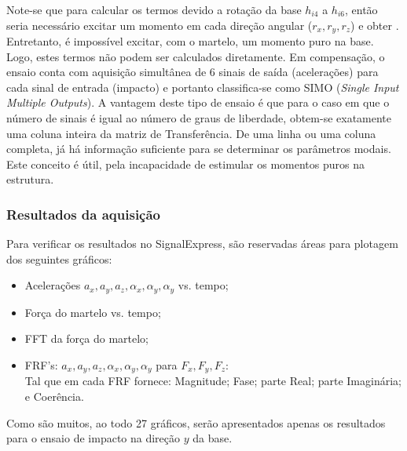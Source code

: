 Note-se que para calcular os termos devido a rotação da base $h_{i4}$ a
$h_{i6}$, então seria necessário excitar um momento em cada direção angular
($r_x,r_y,r_z$) e obter . Entretanto, é impossível excitar, com o martelo, um
momento puro na base. Logo, estes termos não podem ser calculados diretamente.
Em compensação, o ensaio conta com aquisição simultânea de 6 sinais de saída
(acelerações) para cada sinal de entrada (impacto) e portanto classifica-se como
SIMO (\textit{Single Input Multiple Outputs}). A vantagem deste tipo de ensaio é
que para o caso em que o número de sinais é igual ao número de graus de
liberdade, obtem-se exatamente uma coluna inteira da matriz de Transferência. De
uma linha ou uma coluna completa, já há informação suficiente para  se
determinar os parâmetros modais. Este conceito é útil, pela incapacidade de
estimular os momentos puros na estrutura.

\subsubsection{Resultados da aquisição}

Para verificar os resultados no SignalExpress, são reservadas áreas para
plotagem dos seguintes gráficos:
%
\begin{itemize}
  \item Acelerações $a_x, a_y, a_z, \alpha_x, \alpha_y, \alpha_y$ vs.
  tempo;
  \item Força do martelo vs. tempo;
  \item FFT da força do martelo;
  \item FRF's: $a_x, a_y, a_z, \alpha_x, \alpha_y, \alpha_y$ para $F_x, F_y,
  F_z$: \\ Tal que em cada FRF fornece: Magnitude; Fase; parte Real; parte
  Imaginária; e Coerência.
\end{itemize}
%
Como são muitos, ao todo 27 gráficos, serão apresentados apenas os
resultados para o ensaio de impacto na direção $y$ da base.








